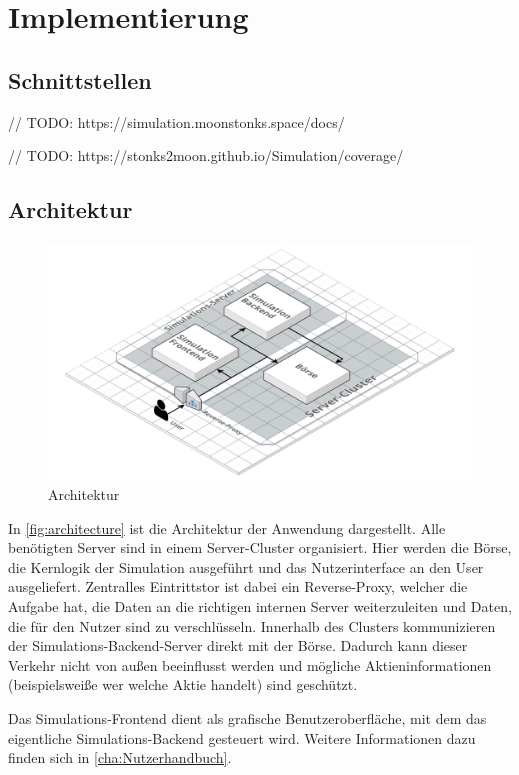 \chapter{Implementierung}

\section{Schnittstellen}
// TODO: https://simulation.moonstonks.space/docs/

// TODO: https://stonks2moon.github.io/Simulation/coverage/

\section{Architektur}
\begin{figure}[ht]
    \includegraphics[width=\textwidth]{img/architecture.png}
    \centering
    \caption{Architektur}
    \label{fig:architecture}
\end{figure}

In \autoref{fig:architecture} ist die Architektur der Anwendung dargestellt.
Alle benötigten Server sind in einem Server-Cluster organisiert.
Hier werden die Börse, die Kernlogik der Simulation ausgeführt und das Nutzerinterface an den User ausgeliefert. Zentralles Eintrittstor ist dabei ein Reverse-Proxy, welcher die Aufgabe hat, die Daten an die richtigen internen Server weiterzuleiten und Daten, die für den Nutzer sind zu verschlüsseln.
Innerhalb des Clusters kommunizieren der Simulations-Backend-Server direkt mit der Börse. Dadurch kann dieser Verkehr nicht von außen beeinflusst werden und mögliche Aktieninformationen (beispielsweiße wer welche Aktie handelt) sind geschützt.

Das Simulations-Frontend dient als grafische Benutzeroberfläche, mit dem das eigentliche Simulations-Backend gesteuert wird. Weitere Informationen dazu finden sich in \autoref{cha:Nutzerhandbuch}.

